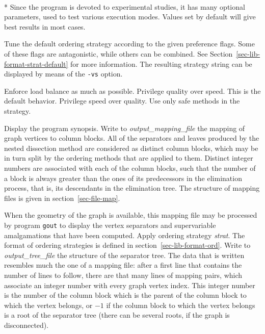 \begin{itemize}
\progopt\\*
Since the program is devoted to experimental studies, it has many
optional parameters, used to test various execution modes. Values
set by default will give best results in most cases.
\begin{itemize}
Tune the default ordering strategy according to the given preference
flags. Some of these flags are antagonistic, while others can be
combined. See Section~\ref{sec-lib-format-strat-default} for more
information. The resulting strategy string can be displayed by means
of the \texttt{-vs} option.
\begin{itemize}
\iteme[\texttt{b}]
Enforce load balance as much as possible.
\iteme[\texttt{q}]
Privilege quality over speed. This is the default behavior.
\iteme[\texttt{s}]
Privilege speed over quality.
\iteme[\texttt{t}]
Use only safe methods in the strategy.
\end{itemize}
\iteme[\texttt{-h}]
Display the program synopsis.
Write to {\it output\_mapping\_file\/} the mapping of graph vertices to
column blocks. All of the separators and leaves produced by the nested
dissection method are considered as distinct column blocks, which may
be in turn split by the ordering methods that are applied to them.
Distinct integer numbers are associated with each of the column blocks,
such that the number of a block is always greater than the ones of its
predecessors in the elimination process, that is, its descendants in the
elimination tree.
The structure of mapping files is given in section~\ref{sec-file-map}.

When the geometry of the graph is available, this mapping file may be
processed by program \texttt{gout} to display the vertex separators and
supervariable amalgamations that have been computed.
Apply ordering strategy {\it strat}. The format of ordering
strategies is defined in section~\ref{sec-lib-format-ord}.
Write to {\it output\_tree\_file\/} the structure of the separator
tree. The data that is written resembles much the one of a mapping
file: after a first line that contains the number of lines to follow,
there are that many lines of mapping pairs, which associate an integer
number with every graph vertex index. This integer number is the
number of the column block which is the parent of the column block to
which the vertex belongs, or $-1$ if the column block to which the
vertex belongs is a root of the separator tree (there can be several
roots, if the graph is disconnected).


\end{itemize}
\end{itemize}
